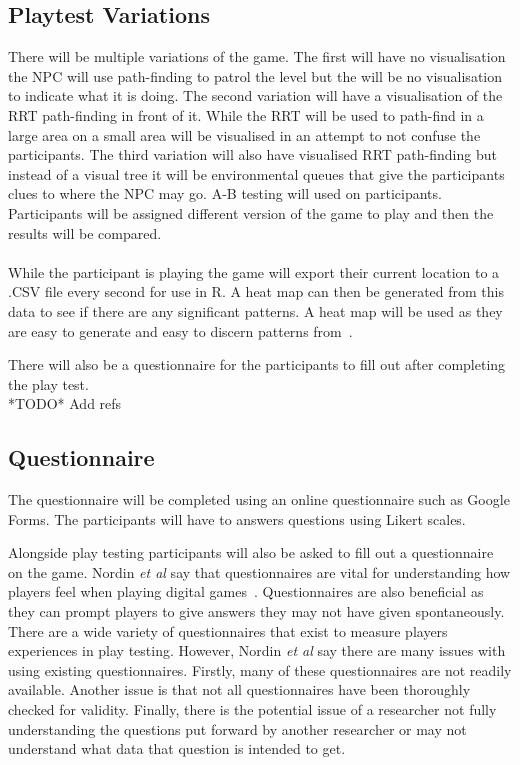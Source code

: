 \documentclass[journal]{IEEEtran}
\begin{document}
\subsection{Playtest Variations}
There will be multiple variations of the game. The first will have no visualisation the NPC will use path-finding to patrol the level but the will be no visualisation to indicate what it is doing.  The second variation will have a visualisation of the RRT path-finding in front of it. While the RRT will be used to path-find in a large area on a small area will be visualised in an attempt to not confuse the participants. The third variation will also have visualised RRT path-finding but instead of a visual tree it will be environmental queues that give the participants clues to where the NPC may go. A-B testing will used on participants. Participants will be assigned different version of the game to play and then the results will be compared. \\
\\
While the participant is playing the game will export their current location to a .CSV file every second for use in R. A heat map can then be generated from this data to see if there are any significant patterns. A heat map will be used as they are easy to generate and easy to discern patterns from~\cite{Wallner2015}.

There will also be a questionnaire for the participants to fill out after completing the play test.\\

*TODO* Add refs

\subsection{Questionnaire}
The questionnaire will be completed using an online questionnaire such as Google Forms. The participants will have to answers questions using Likert scales.

Alongside play testing participants will also be asked to fill out a questionnaire on the game. Nordin \textit{et al} say that questionnaires are vital for understanding how players feel when playing digital games~\cite{nordin2014}. Questionnaires are also beneficial as they can prompt players to give answers they may not have given spontaneously. There are a wide variety of questionnaires that exist to measure players experiences in play testing. However, Nordin \textit{et al} say there are many issues with using existing questionnaires. Firstly, many of these questionnaires are not readily available. Another issue is that not all questionnaires have been thoroughly checked for validity. Finally, there is the potential issue of a researcher not fully understanding the questions put forward by another researcher or may not understand what data that question is intended to get.
  
\end{document}
